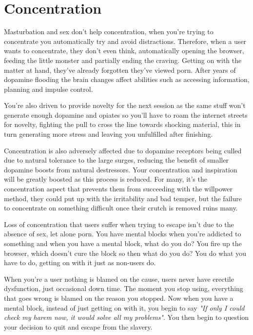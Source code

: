 \documentclass[easypeasy.tex]{subfiles}
\begin{document}
\section{Concentration}

Masturbation and sex don't help concentration, when you're trying to concentrate you automatically try and avoid distractions. Therefore, when a user wants to concentrate, they don't even think, automatically opening the browser, feeding the little monster and partially ending the craving. Getting on with the matter at hand, they've already forgotten they've viewed porn. After years of dopamine flooding the brain changes affect abilities such as accessing information, planning and impulse control.

You're also driven to provide novelty for the next session as the same stuff won't generate enough dopamine and opiates so you'll have to roam the internet streets for novelty, fighting the pull to cross the line towards shocking material, this in turn generating more stress and leaving you unfulfilled after finishing.

Concentration is also adversely affected due to dopamine receptors being culled due to natural tolerance to the large surges, reducing the benefit of smaller dopamine boosts from natural destressors. Your concentration and inspiration will be greatly boosted as this process is reduced. For many, it's the concentration aspect that prevents them from succeeding with the willpower method, they could put up with the irritability and bad temper, but the failure to concentrate on something difficult once their crutch is removed ruins many.

Loss of concentration that users suffer when trying to escape isn't due to the absence of sex, let alone porn. You have mental blocks when you're addicted to something and when you have a mental block, what do you do? You fire up the browser, which doesn't cure the block so then what do you do? You do what you have to do, getting on with it just as non-users do.

When you're a user nothing is blamed on the cause, users never have erectile dysfunction, just occasional down time. The moment you stop using, everything that goes wrong is blamed on the reason you stopped. Now when you have a mental block, instead of just getting on with it, you begin to say \textit{"If only I could check my harem now, it would solve all my problems"}. You then begin to question your decision to quit and escape from the slavery.
\end{document}
